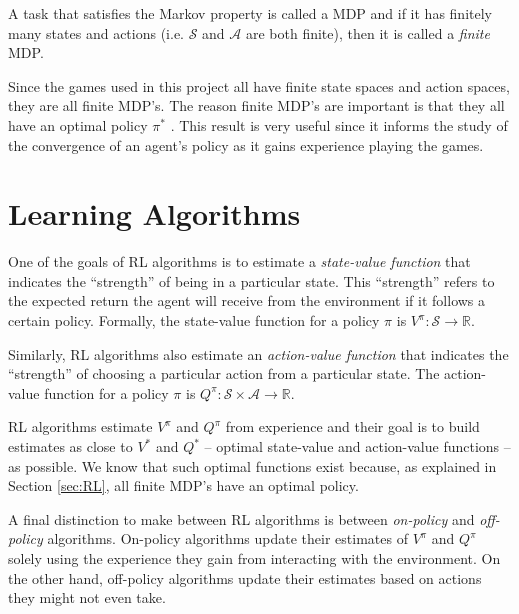 \documentclass[11pt,a4paper]{report}
\begin{document}
A task that satisfies the Markov property is called a MDP and if it has finitely many states and actions (i.e. $\mathcal{S}$ and $\mathcal{A}$ are both finite), then it is called a \emph{finite} MDP. 

Since the games used in this project all have finite state spaces and action spaces, they are all finite MDP's. The reason finite MDP's are important is that they all have an optimal policy $\pi^{\ast}$ \cite{rl-book} \cite{mdp-convergence}. This result is very useful since it informs the study of the convergence of an agent's policy as it gains experience playing the games.


\section{Learning Algorithms}
\label{sec:learning-algorithms}

One of the goals of RL algorithms is to estimate a \emph{state-value function} that indicates the ``strength'' of being in a particular state. This ``strength'' refers to the expected return the agent will receive from the environment if it follows a certain policy. Formally, the state-value function for a policy $\pi$ is $V^{\pi} : \mathcal{S} \rightarrow \mathbb{R}$.

Similarly, RL algorithms also estimate an \emph{action-value function} that indicates the ``strength'' of choosing a particular action from a particular state. The action-value function for a policy $\pi$ is $Q^{\pi} : \mathcal{S} \times \mathcal{A} \rightarrow \mathbb{R}$.

RL algorithms estimate $V^{\pi}$ and $Q^{\pi}$ from experience and their goal is to build estimates as close to $V^{\ast}$ and $Q^{\ast}$ -- optimal state-value and action-value functions -- as possible. We know that such optimal functions exist because, as explained in Section \ref{sec:RL}, all finite MDP's have an optimal policy.

A final distinction to make between RL algorithms is between \emph{on-policy} and \emph{off-policy} algorithms. On-policy algorithms update their estimates of  $V^{\pi}$ and  $Q^{\pi}$ solely using the experience they gain from interacting with the environment. On the other hand, off-policy algorithms update their estimates based on actions they might not even take.
\end{document}
